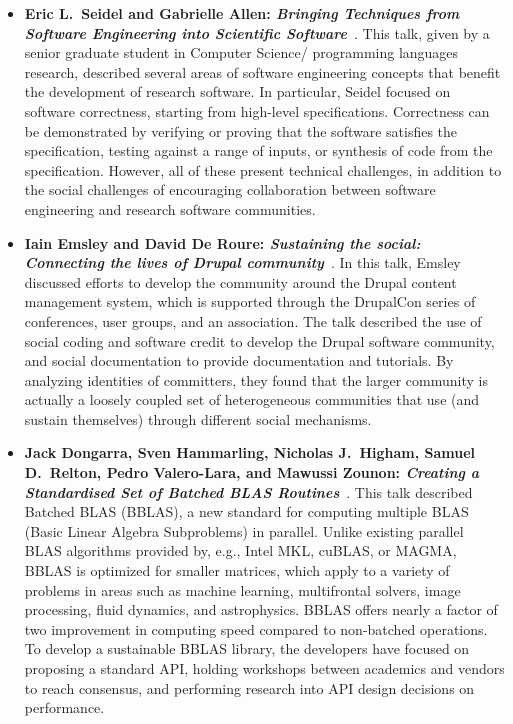 \documentclass[11pt, oneside]{amsart}
\begin{document}
\begin{itemize}[itemsep=1ex]
    \item \textbf{Eric L.~Seidel\textsuperscript{\textasteriskcentered}
    and Gabrielle Allen: \textit{Bringing Techniques from Software Engineering
    into Scientific Software}}~\cite{Seidel:2016ws}.
    This talk, given by a senior graduate student in Computer Science\slash
    programming languages research, described several areas of software engineering
    concepts that benefit the development of research software. In particular,
    Seidel focused on software correctness, starting from high-level
    specifications. Correctness can be demonstrated by verifying or proving
    that the software satisfies the specification, testing against a range of
    inputs, or synthesis of code from the specification. However, all of these
    present technical challenges, in addition to the social challenges of
    encouraging collaboration between software engineering and research software
    communities.

    \item \textbf{Iain Emsley\textsuperscript{\textasteriskcentered} and David
    De Roure: \textit{Sustaining the social: Connecting the lives of Drupal
    community}}~\cite{Emsley:2016ws}.
    In this talk, Emsley discussed efforts to develop the community around the
    Drupal content management system, which is supported through the DrupalCon
    series of conferences, user groups, and an association.
    The talk described the use of social coding and software credit to develop
    the Drupal software community, and social documentation to provide
    documentation and tutorials. By analyzing identities of committers, they
    found that the larger community is actually a loosely coupled set of
    heterogeneous communities that use (and sustain themselves) through different
    social mechanisms.

    \item \textbf{Jack Dongarra, Sven Hammarling, Nicholas J.\ Higham, Samuel
    D.\ Relton\textsuperscript{\textasteriskcentered}, Pedro Valero-Lara,
    and Mawussi Zounon: \textit{Creating a Standardised Set of Batched
    BLAS Routines}}~\cite{Dongarra:2016ws}.
    This talk described Batched BLAS (BBLAS), a new standard for computing multiple
    BLAS (Basic Linear Algebra Subproblems) in parallel. Unlike existing parallel
    BLAS algorithms provided by, e.g., Intel MKL, cuBLAS, or MAGMA, BBLAS is
    optimized for smaller matrices, which apply to a variety of problems in areas
    such as machine learning, multifrontal solvers, image processing, fluid
    dynamics, and astrophysics. BBLAS offers nearly a factor of two improvement
    in computing speed compared to non-batched operations. To develop a sustainable
    BBLAS library, the developers have focused on proposing a standard API,
    holding workshops between academics and vendors to reach consensus, and
    performing research into API design decisions on performance.


\end{itemize}
\end{document}
